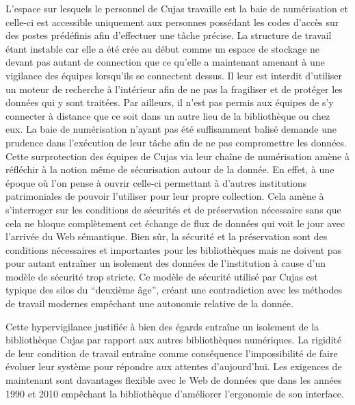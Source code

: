 L'espace sur lesquels le personnel de Cujas travaille est la baie de numérisation et celle-ci est accessible uniquement aux personnes possédant les codes d'accès sur des postes prédéfinis afin d'effectuer une tâche précise. La structure de travail étant instable car elle a été crée au début comme un espace de stockage ne devant pas autant de connection que ce qu'elle a maintenant amenant à une vigilance des équipes lorsqu'ils se connectent dessus. Il leur est interdit d'utiliser un moteur de recherche à l'intérieur afin de ne pas la fragiliser et de protéger les données qui y sont traitées. Par ailleurs, il n'est pas permis aux équipes de s'y connecter à distance que ce soit dans un autre lieu de la bibliothèque ou chez eux. La baie de numérisation n'ayant pas été suffisamment balisé demande une prudence dans l'exécution de leur tâche afin de ne pas compromettre les données. 
Cette surprotection des équipes de Cujas via leur chaîne de numérisation amène à réfléchir à la notion même de sécurisation autour de la donnée. En effet, à une époque où l'on pense à ouvrir celle-ci permettant à d'autres institutions patrimoniales de pouvoir l'utiliser pour leur propre collection. Cela amène à s'interroger sur les conditions de sécurités et de préservation nécessaire sans que cela ne bloque complètement cet échange de flux de données qui voit le jour avec l'arrivée du Web sémantique. Bien sûr, la sécurité et la préservation sont des conditions nécessaires et importantes pour les bibliothèques mais ne doivent pas pour autant entraîner un isolement des données de l'institution à cause d'un modèle de sécurité trop stricte. Ce modèle de sécurité utilisé par Cujas est typique des silos du \enquote{deuxième âge}, créant une contradiction avec les méthodes de travail modernes empêchant une autonomie relative de la donnée. 

Cette hypervigilance justifiée à bien des égards entraîne un isolement de la bibliothèque Cujas par rapport aux autres bibliothèques numériques. La rigidité de leur condition de travail entraîne comme conséquence l'impossibilité de faire évoluer leur système pour répondre aux attentes d'aujourd'hui. Les exigences de maintenant sont davantages flexible avec le Web de données que dans les années 1990 et 2010 empêchant la bibliothèque d'améliorer l'ergonomie de son interface.